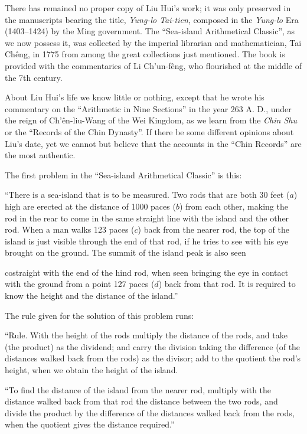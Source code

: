 \documentclass[11pt]{article}
\newcommand{\scanpage}[2]{\clearpage\setcounter{footnote}{0}\noindent{\footnotesize\color{gray}PDF page #1 · #2}\par\medskip}
\newcommand{\scanfooter}{}
\begin{document}
There has remained no proper copy of Liu Hui's work; it was only preserved in the manuscripts bearing the title, \emph{Yung-lo Tai-tien}, composed in the \emph{Yung-lo} Era (1403--1424) by the Ming government. The ``Sea-island Arithmetical Classic'', as we now possess it, was collected by the imperial librarian and mathematician, Tai Chêng, in 1775 from among the great collections just mentioned. The book is provided with the commentaries of Li Ch'un-fêng, who flourished at the middle of the 7th century.

About Liu Hui's life we know little or nothing, except that he wrote his commentary on the ``Arithmetic in Nine Sections'' in the year 263 A. D., under the reign of Ch'ên-liu-Wang of the Wei Kingdom, as we learn from the \emph{Chin Shu} or the ``Records of the Chin Dynasty''. If there be some different opinions about Liu's date, yet we cannot but believe that the accounts in the ``Chin Records'' are the most authentic.

The first problem in the ``Sea-island Arithmetical Classic'' is this:

``There is a sea-island that is to be measured. Two rods that are both 30 feet ($a$) high are erected at the distance of 1000 paces ($b$) from each other, making the rod in the rear to come in the same straight line with the island and the other rod. When a man walks 123 paces ($c$) back from the nearer rod, the top of the island is just visible through the end of that rod, if he tries to see with his eye brought on the ground. The summit of the island peak is also seen
\scanfooter

\scanpage{0049}{Chapter 5, printed page 35}

costraight with the end of the hind rod, when seen bringing the eye in contact with the ground from a point 127 paces ($d$) back from that rod. It is required to know the height and the distance of the island.''

The rule given for the solution of this problem runs:

``Rule. With the height of the rods multiply the distance of the rods, and take (the product) as the dividend; and carry the division taking the difference (of the distances walked back from the rods) as the divisor; add to the quotient the rod's height, when we obtain the height of the island.

``To find the distance of the island from the nearer rod, multiply with the distance walked back from that rod the distance between the two rods, and divide the product by the difference of the distances walked back from the rods, when the quotient gives the distance required.''
\end{document}
